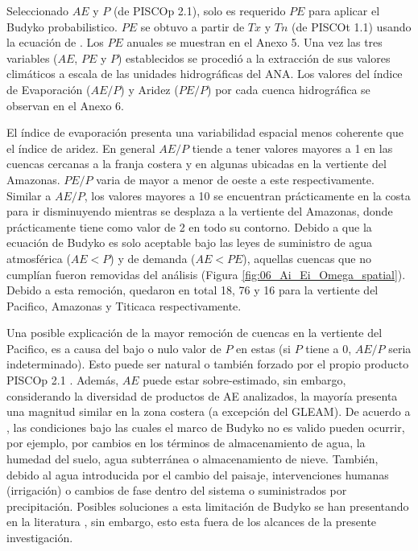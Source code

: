 \documentclass[12pt]{article}
\begin{document}
Seleccionado $AE$ y $P$ (de PISCOp 2.1), solo es requerido $PE$ para aplicar el Budyko probabilistico. $PE$ se obtuvo a partir de $Tx$ y $Tn$ (de PISCOt 1.1) usando la ecuación de \citet{Hargreaves1985}. Los $PE$ anuales se muestran en el Anexo 5. Una vez las tres variables ($AE$, $PE$ y $P$) establecidos se procedió a la extracción de sus valores climáticos a escala de las unidades hidrográficas del ANA. Los valores del índice de Evaporación ($AE/P$) y Aridez ($PE/P$) por cada cuenca hidrográfica se observan en el Anexo 6. 

El índice de evaporación presenta una variabilidad espacial menos coherente que el índice de aridez. En general $AE/P$ tiende a tener valores mayores a 1 en las cuencas cercanas a la franja costera y en algunas ubicadas en la vertiente del Amazonas. $PE/P$ varia de mayor a menor de oeste a este respectivamente. Similar a $AE/P$, los valores mayores a 10 se encuentran prácticamente en la costa para ir disminuyendo mientras se desplaza a la vertiente del Amazonas, donde prácticamente tiene como valor de 2 en todo su contorno. Debido a que la ecuación de Budyko es solo aceptable bajo las leyes de suministro de agua atmosférica ($AE < P$) y de demanda ($AE < PE$), aquellas cuencas que no cumplían fueron removidas del análisis (Figura \ref{fig:06_Ai_Ei_Omega_spatial}). Debido a esta remoción, quedaron en total 18, 76 y 16 para la vertiente del Pacifico, Amazonas y Titicaca respectivamente.



Una posible explicación de la mayor remoción de cuencas en la vertiente del Pacifico, es a causa del bajo o nulo valor de $P$ en estas (si $P$ tiene a 0, $AE/P$ seria indeterminado). Esto puede ser natural o también forzado por el propio producto PISCOp 2.1 \citep{Aybar2019}. Además, $AE$ puede estar sobre-estimado, sin embargo, considerando la diversidad de productos de AE analizados, la mayoría presenta una magnitud similar en la zona costera (a excepción del GLEAM). De acuerdo a \citet{greve2016two}, las condiciones bajo las cuales el marco de Budyko no es valido pueden ocurrir, por ejemplo, por cambios en los términos de almacenamiento de agua, la humedad del suelo, agua subterránea o almacenamiento de nieve. También, debido al agua introducida por el cambio del paisaje, intervenciones humanas (irrigación) o cambios de fase dentro del sistema o suministrados por precipitación. Posibles soluciones a esta limitación de Budyko se han presentando en la literatura \citep{greve2016two,moussa2016budyko,fathi2019new}, sin embargo, esto esta fuera de los alcances de la presente investigación. 
\end{document}
